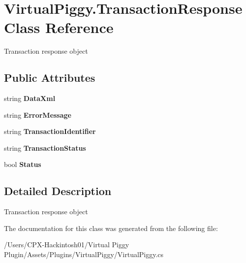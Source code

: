\hypertarget{class_virtual_piggy_1_1_transaction_response}{\section{Virtual\-Piggy.\-Transaction\-Response Class Reference}
\label{class_virtual_piggy_1_1_transaction_response}
}


Transaction response object  


\subsection*{Public Attributes}
\begin{DoxyCompactItemize}
\item 
\hypertarget{class_virtual_piggy_1_1_transaction_response_ab7b2a07aae6d9d39ca288d6712e9af13}{string {\bfseries Data\-Xml}}\label{class_virtual_piggy_1_1_transaction_response_ab7b2a07aae6d9d39ca288d6712e9af13}

\item 
\hypertarget{class_virtual_piggy_1_1_transaction_response_a68a49209ae2dbb9854c8ad8bfac6e130}{string {\bfseries Error\-Message}}\label{class_virtual_piggy_1_1_transaction_response_a68a49209ae2dbb9854c8ad8bfac6e130}

\item 
\hypertarget{class_virtual_piggy_1_1_transaction_response_a62ef9079bb88991e313b6b9fe60b7251}{string {\bfseries Transaction\-Identifier}}\label{class_virtual_piggy_1_1_transaction_response_a62ef9079bb88991e313b6b9fe60b7251}

\item 
\hypertarget{class_virtual_piggy_1_1_transaction_response_ab1a48c5351474f984a6dbe6aca79adb0}{string {\bfseries Transaction\-Status}}\label{class_virtual_piggy_1_1_transaction_response_ab1a48c5351474f984a6dbe6aca79adb0}

\item 
\hypertarget{class_virtual_piggy_1_1_transaction_response_a82e3175e280b55c49dbb92ab45f0af04}{bool {\bfseries Status}}\label{class_virtual_piggy_1_1_transaction_response_a82e3175e280b55c49dbb92ab45f0af04}

\end{DoxyCompactItemize}


\subsection{Detailed Description}
Transaction response object 



The documentation for this class was generated from the following file\-:\begin{DoxyCompactItemize}
\item 
/\-Users/\-C\-P\-X-\/\-Hackintosh01/\-Virtual Piggy Plugin/\-Assets/\-Plugins/\-Virtual\-Piggy/Virtual\-Piggy.\-cs\end{DoxyCompactItemize}
